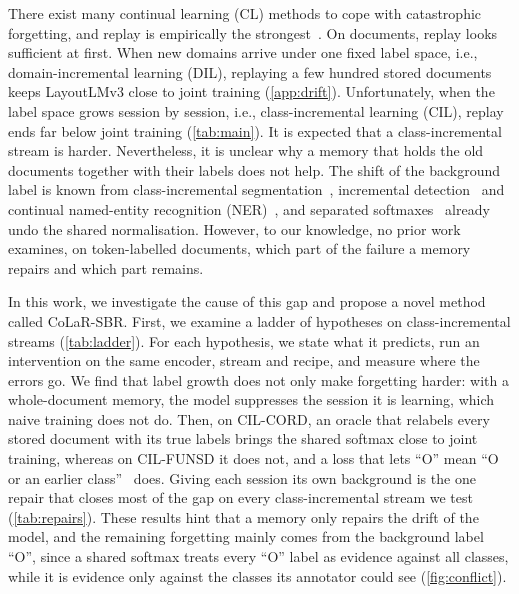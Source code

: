 \documentclass[10pt,twocolumn,letterpaper]{article}
\begin{document}
There exist many continual learning (CL) methods to cope with catastrophic forgetting, and replay is empirically the strongest~\citep{masana2022class,wang2024survey}. On documents, replay looks sufficient at first. When new domains arrive under one fixed label space, i.e., domain-incremental learning (DIL), replaying a few hundred stored documents keeps LayoutLMv3 close to joint training (\cref{app:drift}). Unfortunately, when the label space grows session by session, i.e., class-incremental learning (CIL), replay ends far below joint training (\cref{tab:main}). It is expected that a class-incremental stream is harder. Nevertheless, it is unclear why a memory that holds the old documents together with their labels does not help. The shift of the background label is known from class-incremental segmentation~\citep{cermelli2020mib,douillard2021plop}, incremental detection~\citep{liu2023abr,mo2024bpf} and continual named-entity recognition (NER)~\citep{monaikul2021extendner,zhang2023cpfd}, and separated softmaxes~\citep{ahn2021ssil,kim2022more,liu2023ice} already undo the shared normalisation. However, to our knowledge, no prior work examines, on token-labelled documents, which part of the failure a memory repairs and which part remains.



In this work, we investigate the cause of this gap and propose a novel method called CoLaR-SBR. First, we examine a ladder of hypotheses on class-incremental streams (\cref{tab:ladder}). For each hypothesis, we state what it predicts, run an intervention on the same encoder, stream and recipe, and measure where the errors go. We find that label growth does not only make forgetting harder: with a whole-document memory, the model suppresses the session it is learning, which naive training does not do. Then, on CIL-CORD, an oracle that relabels every stored document with its true labels brings the shared softmax close to joint training, whereas on CIL-FUNSD it does not, and a loss that lets ``O'' mean ``O or an earlier class''~\citep{cermelli2020mib} does. Giving each session its own background is the one repair that closes most of the gap on every class-incremental stream we test (\cref{tab:repairs}). These results hint that a memory only repairs the drift of the model, and the remaining forgetting mainly comes from the background label ``O'', since a shared softmax treats every ``O'' label as evidence against all classes, while it is evidence only against the classes its annotator could see (\cref{fig:conflict}).
\end{document}
